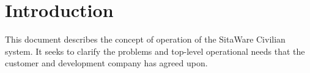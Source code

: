 \chapter{Introduction}
This document describes the concept of operation of the SitaWare Civilian system. It seeks to clarify the problems and top-level operational needs that the customer and development company has agreed upon. 